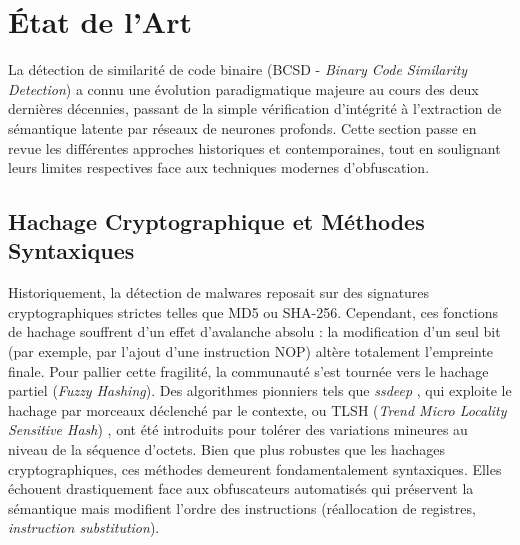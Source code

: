 \section{État de l'Art}
\label{sec:etat_de_l_art}

La détection de similarité de code binaire (BCSD - \textit{Binary Code Similarity Detection}) a connu une évolution paradigmatique majeure au cours des deux dernières décennies, passant de la simple vérification d'intégrité à l'extraction de sémantique latente par réseaux de neurones profonds.
Cette section passe en revue les différentes approches historiques et contemporaines, tout en soulignant leurs limites respectives face aux techniques modernes d'obfuscation.

\subsection{Hachage Cryptographique et Méthodes Syntaxiques}
Historiquement, la détection de malwares reposait sur des signatures cryptographiques strictes telles que MD5 ou SHA-256.
Cependant, ces fonctions de hachage souffrent d'un effet d'avalanche absolu : la modification d'un seul bit (par exemple, par l'ajout d'une instruction NOP) altère totalement l'empreinte finale.
Pour pallier cette fragilité, la communauté s'est tournée vers le hachage partiel (\textit{Fuzzy Hashing}).
Des algorithmes pionniers tels que \textit{ssdeep} \cite{kornblum2006ssdeep}, qui exploite le hachage par morceaux déclenché par le contexte, ou TLSH (\textit{Trend Micro Locality Sensitive Hash}) \cite{oliver2013tlsh}, ont été introduits pour tolérer des variations mineures au niveau de la séquence d'octets.
Bien que plus robustes que les hachages cryptographiques, ces méthodes demeurent fondamentalement syntaxiques.
Elles échouent drastiquement face aux obfuscateurs automatisés qui préservent la sémantique mais modifient l'ordre des instructions (réallocation de registres, \textit{instruction substitution}).

